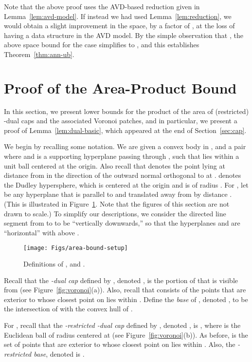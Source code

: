 \documentclass[11pt]{article}   \usepackage[letterpaper,hmargin=2.1cm,vmargin=3cm]{geometry}
\begin{document}
Note that the above proof uses the AVD-based reduction given in Lemma~\ref{lem:avd-model}. If instead we had used Lemma~\ref{lem:reduction}, we would obtain a slight improvement in the space, by a factor of , at the loss of having a data structure in the AVD model. By the simple observation that , the above space bound for the  case simplifies to , and this establishes Theorem~\ref{thm:ann-ub}.

\section{Proof of the Area-Product Bound} \label{sec:proof}


In this section, we present lower bounds for the product of the area of (restricted) -dual caps and the associated Voronoi patches, and in particular, we present a proof of Lemma~\ref{lem:dual-basic}, which appeared at the end of Section~\ref{sec:cap}.

We begin by recalling some notation. We are given a convex body  in , and a pair  where  and  is a supporting hyperplane passing through , such that  lies within a unit ball centered at the origin. Also recall that  denotes the point lying at distance  from  in the direction of the outward normal orthogonal to  at .  denotes the Dudley hypersphere, which is centered at the origin and is of radius . For , let  be any hyperplane that is parallel to  and translated away from  by distance . (This is illustrated in Figure~\ref{fig:area-bound-setup}. Note that the figures of this section are not drawn to scale.) To simplify our descriptions, we consider the directed line segment from  to  to be ``vertically downwards,'' so that the hyperplanes  and  are ``horizontal'' with  above .

\begin{figure}[htbp]
  \centerline{\texttt{[image: Figs/area-bound-setup]}}
  \caption{Definitions of ,  and .}
  \label{fig:area-bound-setup}
\end{figure}


Recall that the \emph{-dual cap} defined by , denoted , is the portion of  that is visible from  (see Figure~\ref{fig:voronoi}(a)). Also, recall that  consists of the points that are exterior to  whose closest point on  lies within . Define the \emph{base} of , denoted , to be the intersection of  with the convex hull of . 

For , recall that the \emph{-restricted -dual cap} defined by , denoted , is , where  is the Euclidean ball of radius  centered at  (see Figure~\ref{fig:voronoi}(b)). As before,  is the set of points that are exterior to  whose closest point on  lies within . Also, the \emph{-restricted base}, denoted  is .
\end{document}
